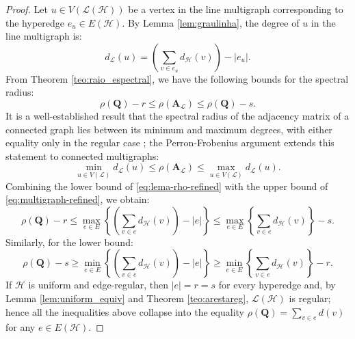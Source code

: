 \documentclass[12pt,reqno]{amsart}
\begin{document}
\begin{proof}
Let $u \in V(\mathcal{L}(\mathcal{H}))$ be a vertex in the line multigraph corresponding to the hyperedge $e_u \in E(\mathcal{H})$. By Lemma \ref{lem:graulinha}, the degree of $u$ in the line multigraph is:
\begin{equation*}
d_{\mathcal{L}}(u) = \left( \sum_{v \in e_u} d_{\mathcal{H}}(v) \right) - |e_u|.
\end{equation*}
From Theorem \ref{teo:raio_espectral}, we have the following bounds for the spectral radius:
\begin{equation}\label{eq:lema-rho-refined}
\rho(\mathbf{Q}) - r \leq \rho(\mathbf{A}_{\mathcal{L}}) \leq \rho(\mathbf{Q}) - s.
\end{equation}
It is a well-established result that the spectral radius of the adjacency matrix of a connected graph lies between its minimum and maximum degrees, with either equality only in the regular case \cite{Stevanovic}; the Perron-Frobenius argument extends this statement to connected multigraphs:
\begin{equation}\label{eq:multigraph-refined}
\min_{u \in V(\mathcal{L})} d_{\mathcal{L}}(u) \leq \rho(\mathbf{A}_{\mathcal{L}}) \leq \max_{u \in V(\mathcal{L})} d_{\mathcal{L}}(u).
\end{equation}
Combining the lower bound of \eqref{eq:lema-rho-refined} with the upper bound of \eqref{eq:multigraph-refined}, we obtain:
\begin{equation*}
\rho(\mathbf{Q}) - r \leq \max_{e \in E} \left\{ \left( \sum_{v \in e} d_{\mathcal{H}}(v) \right) - |e| \right\} \leq \max_{e \in E} \left\{ \sum_{v \in e} d_{\mathcal{H}}(v) \right\} - s.
\end{equation*}
Similarly, for the lower bound:
\begin{equation*}
\rho(\mathbf{Q}) - s \geq \min_{e \in E} \left\{ \left( \sum_{v \in e} d_{\mathcal{H}}(v) \right) - |e| \right\} \geq \min_{e \in E} \left\{ \sum_{v \in e} d_{\mathcal{H}}(v) \right\} - r.
\end{equation*}
If $\mathcal{H}$ is uniform and edge-regular, then $|e| = r = s$ for every hyperedge and, by Lemma \ref{lem:uniform_equiv} and Theorem \ref{teo:arestareg}, $\mathcal{L}(\mathcal{H})$ is regular; hence all the inequalities above collapse into the equality $\rho(\mathbf{Q}) = \sum_{v \in e} d(v)$ for any $e \in E(\mathcal{H})$.


\end{proof}
\end{document}
